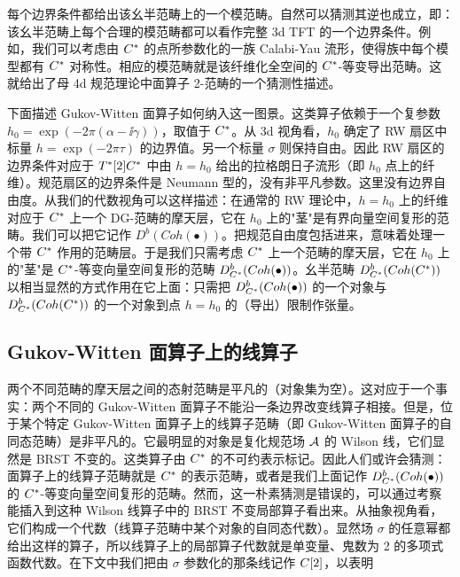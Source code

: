每个边界条件都给出该幺半范畴上的一个模范畴。自然可以猜测其逆也成立，即：该幺半范畴上每个合理的模范畴都可以看作完整 3d TFT 的一个边界条件。例如，我们可以考虑由 $C^*$ 的点所参数化的一族 Calabi-Yau 流形，使得族中每个模型都有 $C^*$ 对称性。相应的模范畴就是该纤维化全空间的 $C^*$-等变导出范畴。这就给出了母 4d 规范理论中面算子 2-范畴的一个猜测性描述。


下面描述 Gukov-Witten 面算子如何纳入这一图景。这类算子依赖于一个复参数 $h_0=\exp(-2\pi(\alpha-\ii\gamma))$，取值于 $C^*$。从 3d 视角看，$h_0$ 确定了 RW 扇区中标量 $h=\exp(-2\pi\tau)$ 的边界值。另一个标量 $\sigma$ 则保持自由。因此 RW 扇区的边界条件对应于 $T^*[2]C^*$ 中由 $h=h_0$ 给出的拉格朗日子流形（即 $h_0$ 点上的纤维）。规范扇区的边界条件是 Neumann 型的，没有非平凡参数。这里没有边界自由度。从我们的代数视角可以这样描述：在通常的 RW 理论中，$h=h_0$ 上的纤维对应于 $C^*$ 上一个 DG-范畴的摩天层，它在 $h_0$ 上的"茎"是有界向量空间复形的范畴。我们可以把它记作 $D^b(Coh(\bullet))$。把规范自由度包括进来，意味着处理一个带 $C^*$ 作用的范畴层。于是我们只需考虑 $C^*$ 上一个范畴的摩天层，它在 $h_0$ 上的"茎"是 $C^*$-等变向量空间复形的范畴 $D^b_{C^*}(Coh(\bullet))$。幺半范畴 $D^b_{C^*}(Coh(C^*))$ 以相当显然的方式作用在它上面：只需把 $D^b_{C^*}(Coh(\bullet))$ 的一个对象与 $D^b_{C^*}(Coh(C^*))$ 的一个对象到点 $h=h_0$ 的（导出）限制作张量。


\subsection{Gukov-Witten 面算子上的线算子}

两个不同范畴的摩天层之间的态射范畴是平凡的（对象集为空）。这对应于一个事实：两个不同的 Gukov-Witten 面算子不能沿一条边界改变线算子相接。但是，位于某个特定 Gukov-Witten 面算子上的线算子范畴（即 Gukov-Witten 面算子的自同态范畴）是非平凡的。它最明显的对象是复化规范场 $\mathcal{A}$ 的 Wilson 线，它们显然是 BRST 不变的。这类算子由 $C^*$ 的不可约表示标记。因此人们或许会猜测：面算子上的线算子范畴就是 $C^*$ 的表示范畴，或者是我们上面记作 $D^b_{C^*}(Coh(\bullet))$ 的 $C^*$-等变向量空间复形的范畴。然而，这一朴素猜测是错误的，可以通过考察能插入到这种 Wilson 线算子中的 BRST 不变局部算子看出来。从抽象视角看，它们构成一个代数（线算子范畴中某个对象的自同态代数）。显然场 $\sigma$ 的任意幂都给出这样的算子，所以线算子上的局部算子代数就是单变量、鬼数为 2 的多项式函数代数。在下文中我们把由 $\sigma$ 参数化的那条线记作 $C[2]$，以表明


